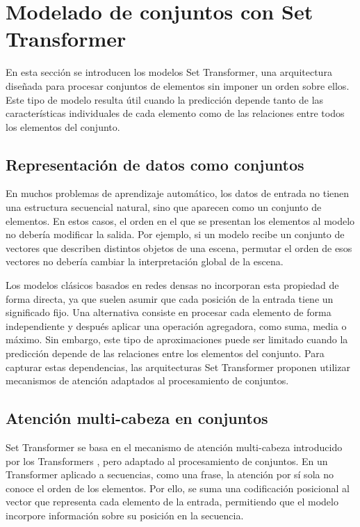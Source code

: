 \section{Modelado de conjuntos con Set Transformer}
\label{sec:setTransformer}

En esta sección se introducen los modelos Set Transformer, una arquitectura diseñada para procesar conjuntos de elementos sin imponer un orden sobre ellos. Este tipo de modelo resulta útil cuando la predicción depende tanto de las características individuales de cada elemento como de las relaciones entre todos los elementos del conjunto.

\subsection{Representación de datos como conjuntos}
En muchos problemas de aprendizaje automático, los datos de entrada no tienen una estructura secuencial natural, sino que aparecen como un conjunto de elementos. En estos casos, el orden en el que se presentan los elementos al modelo no debería modificar la salida. Por ejemplo, si un modelo recibe un conjunto de vectores que describen distintos objetos de una escena, permutar el orden de esos vectores no debería cambiar la interpretación global de la escena. 

Los modelos clásicos basados en redes densas no incorporan esta propiedad de forma directa, ya que suelen asumir que cada posición de la entrada tiene un significado fijo. Una alternativa consiste en procesar cada elemento de forma independiente y después aplicar una operación agregadora, como suma, media o máximo. Sin embargo, este tipo de aproximaciones puede ser limitado cuando la predicción depende de las relaciones entre los elementos del conjunto. Para capturar estas dependencias, las arquitecturas Set Transformer \citep{lee2019settransformer} proponen utilizar mecanismos de atención adaptados al procesamiento de conjuntos.

\subsection{Atención multi-cabeza en conjuntos}
Set Transformer se basa en el mecanismo de atención multi-cabeza introducido por los Transformers \citep{vaswani2017attention}, pero adaptado al procesamiento de conjuntos. En un Transformer aplicado a secuencias, como una frase, la atención por sí sola no conoce el orden de los elementos. Por ello, se suma una codificación posicional al vector que representa cada elemento de la entrada, permitiendo que el modelo incorpore información sobre su posición en la secuencia.

